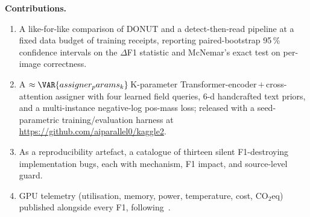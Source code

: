 \medskip
\noindent\textbf{Contributions.}
\begin{enumerate}
\item A like-for-like comparison of DONUT and a detect-then-read
  pipeline at a fixed data budget of  training receipts,
  reporting paired-bootstrap 95\,\% confidence intervals on the
  $\Delta$F1 statistic and McNemar's exact test on per-image
  correctness.
\item A $\approx\VAR{assigner_params_k}\,$K-parameter
  Transformer-encoder\,$+$\,cross-attention assigner with four
  learned field queries, 6-d handcrafted text priors, and a
  multi-instance negative-log pos-mass loss; released with a
  seed-parametric training/evaluation harness at
  \url{https://github.com/aiparallel0/kaggle2}.
\item As a reproducibility artefact, a catalogue of thirteen
  silent F1-destroying implementation bugs, each with mechanism,
  F1 impact, and source-level guard.
\item GPU telemetry (utilisation, memory, power, temperature, cost,
  CO$_2$eq) published alongside every F1, following~\cite{strubell2019energy}.
\end{enumerate}

